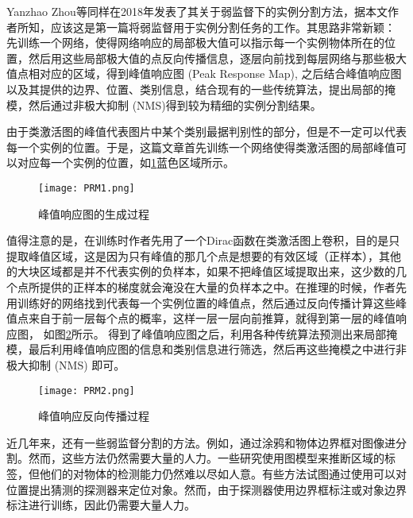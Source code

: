 Yanzhao Zhou等\cite{zhou2018weakly}同样在2018年发表了其关于弱监督下的实例分割方法，据本文作者所知，应该这是第一篇将弱监督用于实例分割任务的工作。其思路非常新颖： 先训练一个网络，使得网络响应的局部极大值可以指示每一个实例物体所在的位置，然后用这些局部极大值的点反向传播信息，逐层向前找到每层网络与那些极大值点相对应的区域，得到峰值响应图 (Peak Response Map), 之后结合峰值响应图以及其提供的边界、位置、类别信息，结合现有的一些传统算法，提出局部的掩模，然后通过非极大抑制 (NMS)得到较为精细的实例分割结果。

由于类激活图的峰值代表图片中某个类别最据判别性的部分，但是不一定可以代表每一个实例的位置。于是，这篇文章首先训练一个网络使得类激活图的局部峰值可以对应每一个实例的位置，如\ref{fig:PRM1}蓝色区域所示。
\begin{figure}[htbp]
\begin{center}
\texttt{[image: PRM1.png]}
\end{center}
\caption{峰值响应图的生成过程\cite{zhou2018weakly}}
\label{fig:PRM1}
\end{figure}

值得注意的是，在训练时作者先用了一个Dirac函数在类激活图上卷积，目的是只提取峰值区域，这是因为只有峰值的那几个点是想要的有效区域（正样本），其他的大块区域都是并不代表实例的负样本，如果不把峰值区域提取出来，这少数的几个点所提供的正样本的梯度就会淹没在大量的负样本之中。在推理的时候，作者先用训练好的网络找到代表每一个实例位置的峰值点，然后通过反向传播计算这些峰值点来自于前一层每个点的概率，这样一层一层向前推算，就得到第一层的峰值响应图， 如图\ref{fig:PRM2}所示。 得到了峰值响应图之后，利用各种传统算法预测出来局部掩模，最后利用峰值响应图的信息和类别信息进行筛选，然后再这些掩模之中进行非极大抑制 (NMS) 即可。

\begin{figure}[htbp]
\begin{center}
\texttt{[image: PRM2.png]}
\end{center}
\caption{峰值响应反向传播过程\cite{zhou2018weakly}}
\label{fig:PRM2}
\end{figure}

近几年来，还有一些弱监督分割的方法。例如，通过涂鸦\cite {lin2016scribblesup, xu2015learning}和物体边界框\cite {dai2015boxsup}对图像进分割。然而，这些方法仍然需要大量的人力。一些研究使用图模型来推断区域的标签\cite {zhang2015weakly, lai2016saliency}，但他们的对物体的检测能力仍然难以尽如人意。有些方法\cite {papandreou2015weakly, bearman2016s, wei2016learning}试图通过使用可以对位置提出猜测的探测器来定位对象\cite {arbelaez2014multiscale, cheng2014bing}。然而，由于探测器使用边界框标注或对象边界标注进行训练，因此仍需要大量人力。

